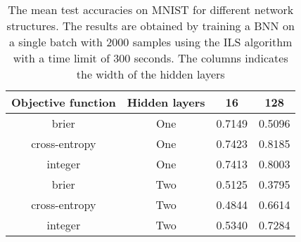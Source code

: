\begin{center}
\begin{table}[H]
\centering
\begin{tabular}{|c|c|c|c|}
  \hline
Objective function & Hidden layers & 16 & 128 \\ 
  \hline
brier & One & 0.7149 & 0.5096 \\ 
   \hline
cross-entropy & One & 0.7423 & 0.8185 \\ 
   \hline
integer & One & 0.7413 & 0.8003 \\ 
   \hline
brier & Two & 0.5125 & 0.3795 \\ 
   \hline
cross-entropy & Two & 0.4844 & 0.6614 \\ 
   \hline
integer & Two & 0.5340 & 0.7284 \\ 
   \hline
\end{tabular}
\caption{The mean test accuracies on MNIST for different network structures. The results are obtained by training a BNN
            on a single batch with 2000 samples using the ILS algorithm with a time limit of 300 seconds.
            The columns indicates the width of the hidden layers} 
\label{SBT_DNS}
\end{table}

\end{center}
